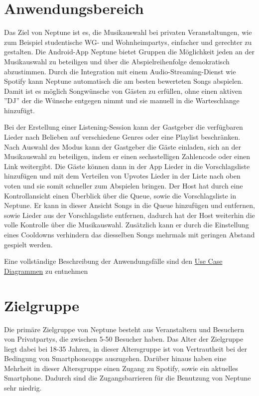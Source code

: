 \documentclass[oneside, ngerman]{sdqtechreport}
\begin{document}
\section{Anwendungsbereich}
\label{sec:Einleitung:Anwendungsbereich}

Das Ziel von Neptune ist es, die Musikauswahl bei privaten Veranstaltungen, wie zum Beispiel studentische WG- und Wohnheimpartys, einfacher und gerechter zu gestalten.
Die Android-App Neptune bietet Gruppen die Möglichkeit jeden an der Musikauswahl zu beteiligen und über die Abspielreihenfolge demokratisch abzustimmen. Durch die Integration mit einem Audio-Streaming-Dienst wie Spotify kann Neptune automatisch die am besten bewerteten Songs abspielen. Damit ist es möglich Songwünsche von Gästen zu erfüllen, ohne einen aktiven ''DJ''  der die Wünsche entgegen nimmt und sie manuell in die Warteschlange hinzufügt.

Bei der Erstellung einer Listening-Session kann der Gastgeber die verfügbaren Lieder nach Belieben auf verschiedene Genres oder eine Playlist beschränken. Nach Auswahl des Modus kann der Gastgeber die Gäste einladen, sich an der Musikauswahl zu beteiligen, indem er einen sechsstelligen Zahlencode oder einen Link weitergibt. Die Gäste können dann in der App Lieder in die Vorschlagsliste hinzufügen und mit dem Verteilen von Upvotes Lieder in der Liste nach oben voten und sie somit schneller zum Abspielen bringen. Der Host hat durch eine Kontrollansicht einen Überblick über die Queue, sowie die Vorschlagsliste in Neptune. Er kann in dieser Ansicht Songs in die Queue hinzufügen und entfernen, sowie Lieder aus der Vorschlagsliste entfernen, dadurch hat der Host weiterhin die volle Kontrolle über die Musikauswahl. Zusätzlich kann er durch die Einstellung
eines Cooldowns verhindern das diesselben Songs mehrmals mit geringen Abstand gespielt werden.

Eine vollständige Beschreibung der Anwendungsfälle sind  den \hyperlink{Anwendungsfaelle}{Use Case Diagrammen} zu entnehmen   


\section{Zielgruppe}
\label{sec:Einleitung:Zielgruppe}

Die primäre Zielgruppe von Neptune besteht aus Veranstaltern und Besuchern von Privatpartys, die zwischen 5-50 Besucher haben. Das Alter der Zielgruppe liegt dabei bei 18-35 Jahren, in dieser Altersgruppe ist von Vertrautheit bei der Bedingung von Smartphoneapps auszugehen. Darüber hinaus haben eine Mehrheit in dieser Altersgruppe einen Zugang zu Spotify, sowie ein aktuelles Smartphone. Dadurch sind die Zugangsbarrieren für die Benutzung von Neptune sehr niedrig.
\end{document}
